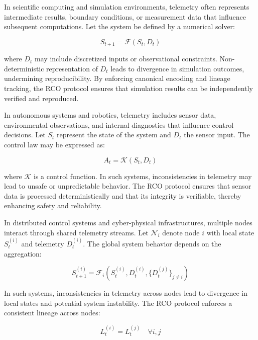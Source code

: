 In scientific computing and simulation environments, telemetry often represents intermediate results, boundary conditions, or measurement data that influence subsequent computations. Let the system be defined by a numerical solver:

\begin{equation}
S_{t+1} = \mathcal{F}(S_t, D_t)
\end{equation}

where $D_t$ may include discretized inputs or observational constraints. Non-deterministic representation of $D_t$ leads to divergence in simulation outcomes, undermining reproducibility. By enforcing canonical encoding and lineage tracking, the RCO protocol ensures that simulation results can be independently verified and reproduced.

In autonomous systems and robotics, telemetry includes sensor data, environmental observations, and internal diagnostics that influence control decisions. Let $S_t$ represent the state of the system and $D_t$ the sensor input. The control law may be expressed as:

\begin{equation}
A_t = \mathcal{K}(S_t, D_t)
\end{equation}

where $\mathcal{K}$ is a control function. In such systems, inconsistencies in telemetry may lead to unsafe or unpredictable behavior. The RCO protocol ensures that sensor data is processed deterministically and that its integrity is verifiable, thereby enhancing safety and reliability.

In distributed control systems and cyber-physical infrastructures, multiple nodes interact through shared telemetry streams. Let $\mathcal{N}_i$ denote node $i$ with local state $S_t^{(i)}$ and telemetry $D_t^{(i)}$. The global system behavior depends on the aggregation:

\begin{equation}
S_{t+1}^{(i)} = \mathcal{F}_i(S_t^{(i)}, D_t^{(i)}, \{D_t^{(j)}\}_{j \neq i})
\end{equation}

In such systems, inconsistencies in telemetry across nodes lead to divergence in local states and potential system instability. The RCO protocol enforces a consistent lineage across nodes:

\begin{equation}
L_t^{(i)} = L_t^{(j)} \quad \forall i,j
\end{equation}

